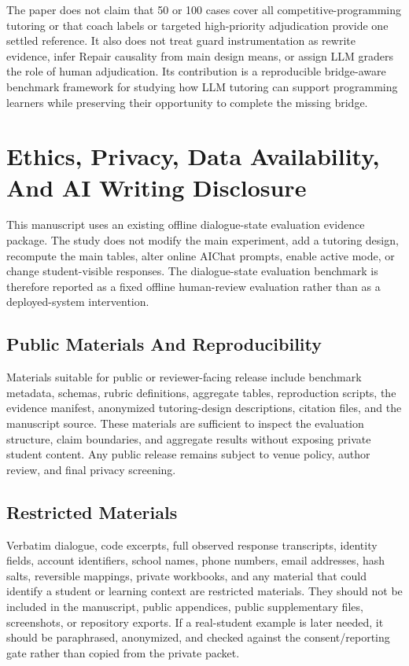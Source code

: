 \documentclass[11pt]{article}
\begin{document}
The paper does not claim that 50 or 100 cases cover all competitive-programming tutoring or that coach labels or targeted high-priority adjudication provide one settled reference. It also does not treat guard instrumentation as rewrite evidence, infer Repair causality from main design means, or assign LLM graders the role of human adjudication. Its contribution is a reproducible bridge-aware benchmark framework for studying how LLM tutoring can support programming learners while preserving their opportunity to complete the missing bridge.

\section{Ethics, Privacy, Data Availability, And AI Writing Disclosure}

This manuscript uses an existing offline dialogue-state evaluation evidence package. The study does not modify the main experiment, add a tutoring design, recompute the main tables, alter online AIChat prompts, enable active mode, or change student-visible responses. The dialogue-state evaluation benchmark is therefore reported as a fixed offline human-review evaluation rather than as a deployed-system intervention.

\subsection{Public Materials And Reproducibility}

Materials suitable for public or reviewer-facing release include benchmark metadata, schemas, rubric definitions, aggregate tables, reproduction scripts, the evidence manifest, anonymized tutoring-design descriptions, citation files, and the manuscript source. These materials are sufficient to inspect the evaluation structure, claim boundaries, and aggregate results without exposing private student content. Any public release remains subject to venue policy, author review, and final privacy screening.

\subsection{Restricted Materials}

Verbatim dialogue, code excerpts, full observed response transcripts, identity fields, account identifiers, school names, phone numbers, email addresses, hash salts, reversible mappings, private workbooks, and any material that could identify a student or learning context are restricted materials. They should not be included in the manuscript, public appendices, public supplementary files, screenshots, or repository exports. If a real-student example is later needed, it should be paraphrased, anonymized, and checked against the consent/reporting gate rather than copied from the private packet.
\end{document}
